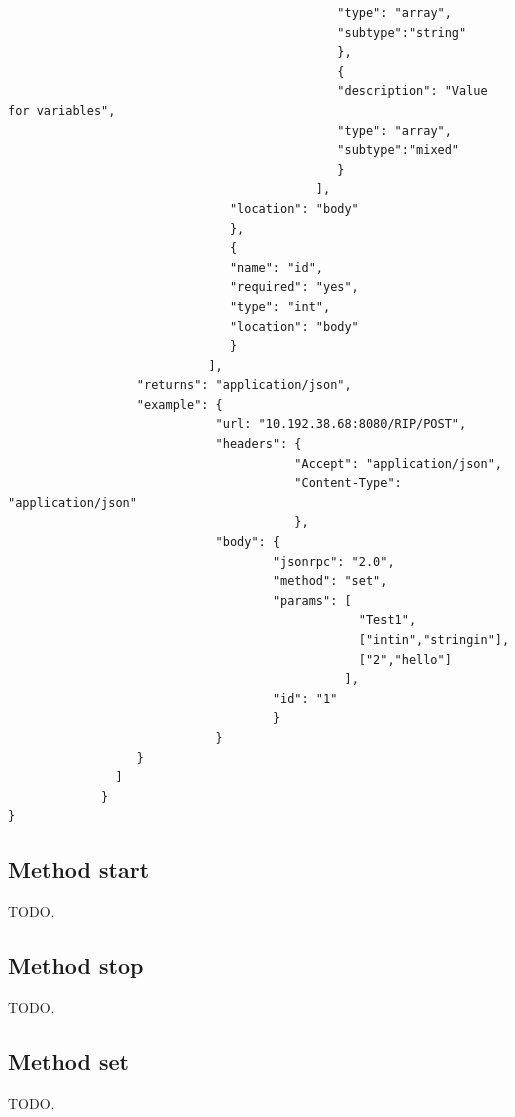 \begin{lstlisting}
                                              "type": "array",
                                              "subtype":"string"
                                              },
                                              {
                                              "description": "Value for variables",
                                              "type": "array",
                                              "subtype":"mixed"
                                              }
                                           ],
                               "location": "body"
                               },
                               {
                               "name": "id",
                               "required": "yes",
                               "type": "int",
                               "location": "body"
                               }
                            ],
                  "returns": "application/json",
                  "example": {
                             "url: "10.192.38.68:8080/RIP/POST",
                             "headers": {
                                        "Accept": "application/json",
                                        "Content-Type": "application/json"
                                        },
                             "body": {
                                     "jsonrpc": "2.0",
                                     "method": "set",
                                     "params": [
                                                 "Test1",
                                                 ["intin","stringin"],
                                                 ["2","hello"]
                                               ],
                                     "id": "1"
                                     }
                             }
                  }
               ]
             }
}
\end{lstlisting}

\subsection{Method start}
TODO.

\subsection{Method stop}
TODO.

\subsection{Method set}
TODO.

